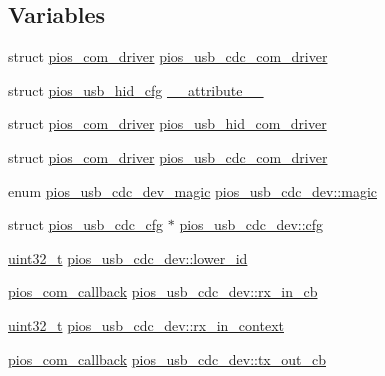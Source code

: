\subsection*{Variables}
\begin{DoxyCompactItemize}
\item 
struct \hyperlink{structpios__com__driver}{pios\-\_\-com\-\_\-driver} \hyperlink{group___p_i_o_s___u_s_b___c_o_m_gad661bf144c28ea36f290b0092e6957e2}{pios\-\_\-usb\-\_\-cdc\-\_\-com\-\_\-driver}
\item 
struct \hyperlink{structpios__usb__hid__cfg}{pios\-\_\-usb\-\_\-hid\-\_\-cfg} \hyperlink{group___p_i_o_s___u_s_b___c_o_m_gac56d93a50756ec83103cdfc4e5a31f3e}{\-\_\-\-\_\-attribute\-\_\-\-\_\-}
\item 
struct \hyperlink{structpios__com__driver}{pios\-\_\-com\-\_\-driver} \hyperlink{group___p_i_o_s___u_s_b___c_o_m_ga7bc5f832e095cad60f463436e377bb5d}{pios\-\_\-usb\-\_\-hid\-\_\-com\-\_\-driver}
\item 
struct \hyperlink{structpios__com__driver}{pios\-\_\-com\-\_\-driver} \hyperlink{group___p_i_o_s___u_s_b___c_o_m_gad661bf144c28ea36f290b0092e6957e2}{pios\-\_\-usb\-\_\-cdc\-\_\-com\-\_\-driver}
\item 
enum \hyperlink{group___p_i_o_s___u_s_b___c_o_m_gab4c476b0e464c59dcf6eadec015a87b8}{pios\-\_\-usb\-\_\-cdc\-\_\-dev\-\_\-magic} \hyperlink{group___p_i_o_s___u_s_b___c_o_m_gaf1f80b904c24c3a9d91aa7c8d9f0e0f7}{pios\-\_\-usb\-\_\-cdc\-\_\-dev\-::magic}
\item 
struct \hyperlink{structpios__usb__cdc__cfg}{pios\-\_\-usb\-\_\-cdc\-\_\-cfg} $\ast$ \hyperlink{group___p_i_o_s___u_s_b___c_o_m_gac129f3ba21ca6cb9ff92da45033acbbb}{pios\-\_\-usb\-\_\-cdc\-\_\-dev\-::cfg}
\item 
\hyperlink{stdint_8h_a435d1572bf3f880d55459d9805097f62}{uint32\-\_\-t} \hyperlink{group___p_i_o_s___u_s_b___c_o_m_ga5431d5544be717a197964da5a3b08d2a}{pios\-\_\-usb\-\_\-cdc\-\_\-dev\-::lower\-\_\-id}
\item 
\hyperlink{group___p_i_o_s___c_o_m_ga23f1888821f1f74a50c02adc459df597}{pios\-\_\-com\-\_\-callback} \hyperlink{group___p_i_o_s___u_s_b___c_o_m_gaf3cf777f785d8b2a117c736064e859de}{pios\-\_\-usb\-\_\-cdc\-\_\-dev\-::rx\-\_\-in\-\_\-cb}
\item 
\hyperlink{stdint_8h_a435d1572bf3f880d55459d9805097f62}{uint32\-\_\-t} \hyperlink{group___p_i_o_s___u_s_b___c_o_m_gae98fcbb800c5655c05106c1e73a1de01}{pios\-\_\-usb\-\_\-cdc\-\_\-dev\-::rx\-\_\-in\-\_\-context}
\item 
\hyperlink{group___p_i_o_s___c_o_m_ga23f1888821f1f74a50c02adc459df597}{pios\-\_\-com\-\_\-callback} \hyperlink{group___p_i_o_s___u_s_b___c_o_m_ga1e9a79d782c5671d5e35aafe776632f3}{pios\-\_\-usb\-\_\-cdc\-\_\-dev\-::tx\-\_\-out\-\_\-cb}

\end{DoxyCompactItemize}

